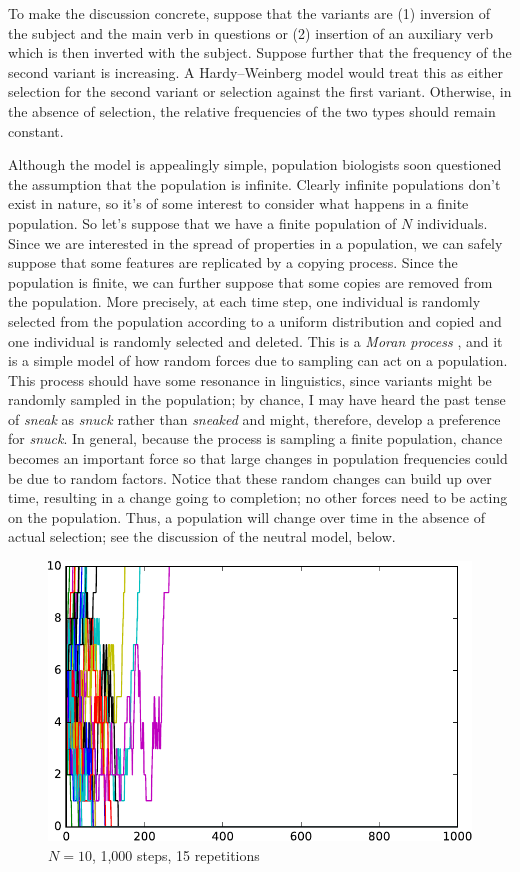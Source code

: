 \documentclass[output=paper]{langsci/langscibook}
\begin{document}
To make the discussion concrete, suppose that the variants are (1)
inversion of the subject and the main verb in questions or (2)
insertion of an auxiliary verb which is then inverted with the
subject.  Suppose further that the frequency of the second variant
is increasing.  A Hardy--Weinberg model would treat this as either
selection for the second variant or selection against the first
variant.  Otherwise, in the absence of selection, the relative
frequencies of the two types should remain constant.

Although the model is appealingly simple, population biologists soon
questioned the assumption that the population is infinite. Clearly
infinite populations don't exist in nature, so it's of some interest to
consider what happens in a finite population.  So let's suppose that
we have a finite population of $N$ individuals.  Since we are
interested in the spread of properties in a population, we can safely
suppose that some features are replicated by a copying process.  Since
the population is finite, we can further suppose that some copies are
removed from the population.  More precisely, at each time step, one
individual is randomly selected from the population according to a
uniform distribution and copied and one individual is randomly
selected and deleted.  This is a \emph{Moran process}
\citep{moran:1958}, and it is a simple model of how random forces due
to sampling can act on a population.  This process should have some
resonance in linguistics, since variants might be randomly sampled in
the population; by chance, I may have heard the past tense of
\emph{sneak} as \emph{snuck} rather than \emph{sneaked} and might,
therefore, develop a preference for \emph{snuck}.  In general, because
the process is sampling a finite population, chance becomes an
important force so that large changes in population frequencies could
be due to random factors.  Notice that these random changes can build
up over time, resulting in a change going to completion; no other
forces need to be acting on the population.  Thus, a population will
change over time in the absence of actual selection; see the
discussion of the neutral model, below.

\begin{figure}
  \includegraphics[width=.75\linewidth]{img/pop10_1000.pdf}
  \caption{$N=10$, 1,000 steps, 15 repetitions\label{random_fig1}}
\end{figure}
\end{document}
